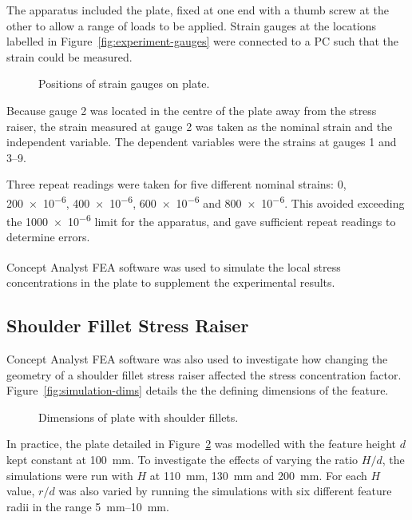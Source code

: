 \documentclass[a4paper,11pt,twocolumn]{article}
\newcommand{\FEA}{{\sc FEA}\xspace}
\newcommand{\mm}{\si{\milli\meter}\xspace}
\begin{document}
{The apparatus included the plate, fixed at one end with a thumb screw at the 
other to allow a range of loads to be applied. Strain gauges at the 
locations labelled in Figure~\vref{fig:experiment-gauges} were connected to a 
\textsc{PC} such that the strain could be measured.

\begin{figure}[h]
    \centering
    \def\svgwidth{0.48\textwidth}
    
    \caption{Positions of strain gauges on plate.}
    \label{fig:experiment-gauges}
\end{figure}

Because gauge 2 was located in the centre of the plate away from the
stress raiser, the strain measured at gauge 2 was taken as the nominal strain
and the independent variable. The dependent variables were the strains at gauges 1 and 3--9.

Three repeat readings were taken for five different nominal strains: 0, 
\num{200e-6}, \num{400e-6}, \num{600e-6} and \num{800e-6}. This avoided
exceeding the \num{1000e-6} limit for the apparatus, and gave sufficient repeat
readings to determine errors.

Concept Analyst\textsuperscript{\textregistered} \FEA software was used to
simulate the local stress concentrations in the plate to supplement the
experimental results.

\subsection{Shoulder Fillet Stress Raiser}

Concept Analyst \FEA software was also used to investigate how changing the
geometry of a shoulder fillet stress raiser affected the stress concentration
factor. Figure~\vref{fig:simulation-dims} details the the defining dimensions of
the feature.

\begin{figure}[h]
    \centering
    \def\svgwidth{0.48\textwidth}
    
    \caption{Dimensions of plate with shoulder fillets.}
    \label{fig:simulation-dims}
\end{figure}

In practice, the plate detailed in Figure~\ref{fig:simulation-dims} was modelled
with the feature height $d$ kept constant at 100~\mm. To investigate the effects
of varying the ratio $H/d$, the simulations were run with $H$ at 110~\mm,
130~\mm and 200~\mm. For each $H$ value, $r/d$ was also varied by running the
simulations with six different feature radii in the range 5~\mm--10~\mm.

}
\end{document}

